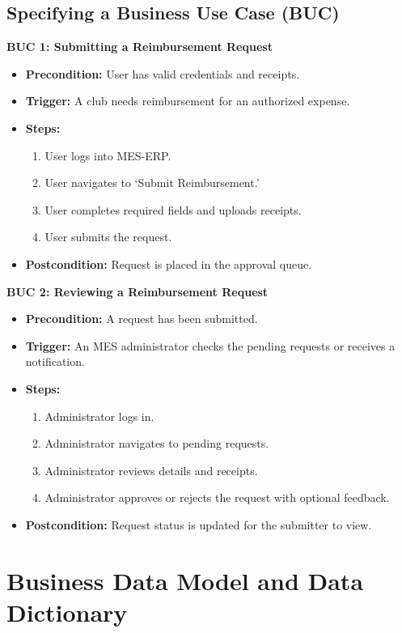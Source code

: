 \documentclass[12pt]{article}
\begin{document}
\subsection{Specifying a Business Use Case (BUC)}
\textbf{BUC 1: Submitting a Reimbursement Request}  
\begin{itemize}
  \item \textbf{Precondition:} User has valid credentials and receipts.
  \item \textbf{Trigger:} A club needs reimbursement for an authorized expense.
  \item \textbf{Steps:}
  \begin{enumerate}
      \item User logs into MES-ERP.
      \item User navigates to `Submit Reimbursement.'
      \item User completes required fields and uploads receipts.
      \item User submits the request.
  \end{enumerate}
  \item \textbf{Postcondition:} Request is placed in the approval queue.
\end{itemize}

\textbf{BUC 2: Reviewing a Reimbursement Request}  
\begin{itemize}
  \item \textbf{Precondition:} A request has been submitted.
  \item \textbf{Trigger:} An MES administrator checks the pending requests or receives a notification.
  \item \textbf{Steps:}
  \begin{enumerate}
      \item Administrator logs in.
      \item Administrator navigates to pending requests.
      \item Administrator reviews details and receipts.
      \item Administrator approves or rejects the request with optional feedback.
  \end{enumerate}
  \item \textbf{Postcondition:} Request status is updated for the submitter to view.
\end{itemize}

\section{Business Data Model and Data Dictionary}
\end{document}
